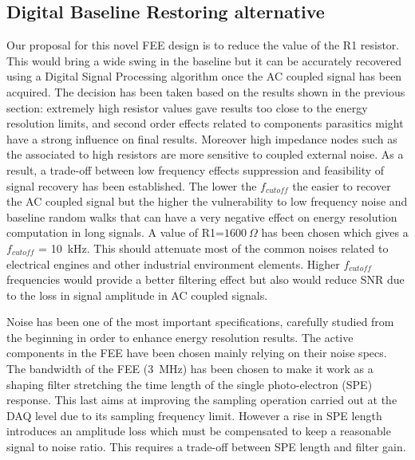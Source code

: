 \documentclass[a4paper, 10pt, oneside, twocolumn, 3p]{elsarticle}
\begin{document}
\subsection{Digital Baseline Restoring alternative}

Our proposal for this novel FEE design is to reduce the value of the R1 resistor. This would bring a wide swing in the baseline but it can be accurately recovered using a Digital Signal Processing algorithm once the AC coupled signal has been acquired. The decision has been taken based on the results shown in the previous section: extremely high resistor values gave results too close to the energy resolution limits, and second order effects related to components parasitics might have a strong influence on final results. Moreover high impedance nodes such as the associated to high resistors are more sensitive to coupled external noise. As a result, a trade-off between low frequency effects suppression and feasibility of signal recovery has been established. The lower the $f_{cutoff}$ the easier to recover the AC coupled signal but the higher the vulnerability to low frequency noise and baseline random walks that can have a very negative effect on energy resolution computation in long signals. A value of R1=$1600~\Omega$ has been chosen which gives a $f_{cutoff}$ = 10~kHz. This should attenuate most of the common noises related to electrical engines and other industrial environment elements. Higher $f_{cutoff}$ frequencies would provide a better filtering effect but also would reduce SNR due to the loss in signal amplitude in AC coupled signals.

\par Noise has been one of the most important specifications, carefully studied from the beginning in order to enhance energy resolution results. The active components in the FEE have been chosen mainly relying on their noise specs. The bandwidth of the FEE (3~MHz) has been chosen to make it work as a shaping filter stretching the time length of the single photo-electron (SPE) response. This last aims at improving the sampling operation carried out at the DAQ level due to its sampling frequency limit. However a rise in SPE length introduces an amplitude loss which must be compensated to keep a reasonable signal to noise ratio. This requires a trade-off between SPE length and filter gain.   

\end{document}
